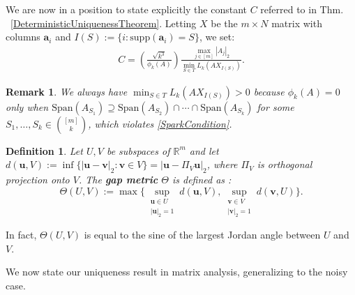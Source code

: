 \documentclass[journal, twocolumn]{IEEEtran}
\newtheorem{definition}{Definition}
\newtheorem{remark}{Remark}
\begin{document}
We are now in a position to state explicitly the constant $C$ referred to in Thm. ~\ref{DeterministicUniquenessTheorem}. Letting 
$X$ be the $m \times N$ matrix with columns $\mathbf{a}_i$ and $I(S) := \{i : \text{supp}(\mathbf{a}_i) = S\}$, we set:
\begin{align}\label{Cdef}
C = \left( \frac{ \sqrt{k^3}}{ \phi_k(A) } \right) \frac{\max_{j \in [m]} |A_j|_2}{\min_{S \in T} L_k(AX_{I(S)})}.
\end{align}

\begin{remark}\label{nonzero}
We always have $\min_{S \in T} L_k(AX_{I(S)}) > 0$ because $\phi_k(A) = 0$ only when $\text{Span}(A_{S_1}) \supseteq \text{Span}(A_{S_2}) \cap \cdots \cap \text{Span}(A_{S_k})$ for some $S_1, \ldots, S_k \in {[m] \choose k}$, which violates \eqref{SparkCondition}.
\end{remark}

\begin{definition}\label{GapMetricDef}
Let $U, V$ be subspaces of $\mathbb{R}^m$ and let $d(\mathbf{u},V) := \inf\{|\mathbf{u}-\mathbf{v}|_2: \mathbf{v} \in V\} = |\mathbf{u} - \Pi_V \mathbf{u}|_2$, where $\Pi_V$ is orthogonal projection onto $V$. The \textbf{gap metric} $\Theta$ is defined as \cite{Akhiezer13}:
\begin{equation*}
\Theta(U,V) := \max \big\{ \sup_{\substack{\mathbf{u} \in U \\ |\mathbf{u}|_2 = 1}} d(\mathbf{u},V), \sup_{\substack{\mathbf{v} \in V \\ |\mathbf{v}|_2 = 1}} d(\mathbf{v},U) \big\}.
\end{equation*}
\end{definition}

In fact, $\Theta(U,V)$ is equal to the sine of the largest Jordan angle between $U$ and $V$. 

We now state our uniqueness result in matrix analysis, generalizing \cite[Lem.~1]{Hillar15} to the noisy case.
\end{document}
